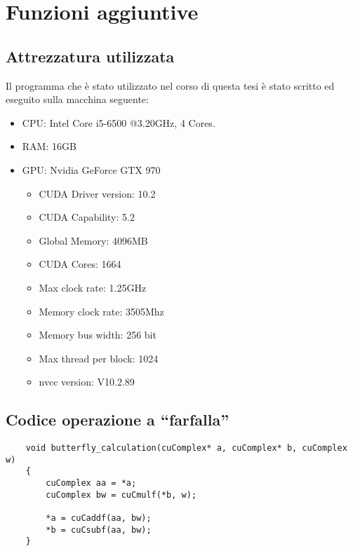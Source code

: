 \chapter{Funzioni aggiuntive}
\section{Attrezzatura utilizzata}
Il programma che è stato utilizzato nel corso di questa tesi è stato scritto ed eseguito sulla macchina seguente:
\begin{itemize}[nosep]
    \item CPU: Intel Core i5-6500 @3.20GHz, 4 Cores.
    \item RAM: 16GB
    \item GPU: Nvidia GeForce GTX 970
    \begin{itemize}[nosep]
        \item CUDA Driver version: 10.2
        \item CUDA Capability: 5.2
        \item Global Memory: 4096MB
        \item CUDA Cores: 1664
        \item Max clock rate: 1.25GHz
        \item Memory clock rate: 3505Mhz
        \item Memory bus width: 256 bit
        \item Max thread per block: 1024
        \item nvcc version: V10.2.89
    \end{itemize}
\end{itemize}

\section{Codice operazione a ``farfalla''}
\begin{lstlisting}
    void butterfly_calculation(cuComplex* a, cuComplex* b, cuComplex w)
    {
        cuComplex aa = *a;
        cuComplex bw = cuCmulf(*b, w);
    
        *a = cuCaddf(aa, bw);
        *b = cuCsubf(aa, bw);
    }    
\end{lstlisting}